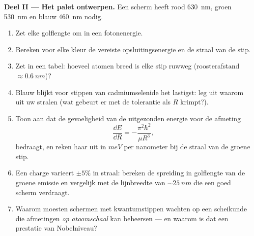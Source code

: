 \begin{problem}
\medskip\noindent\textbf{Deel II --- Het palet ontwerpen.}
Een scherm heeft rood \qty{630}{nm}, groen \qty{530}{nm} en blauw
\qty{460}{nm} nodig.
\begin{enumerate}[resume]
  \item Zet elke golflengte om in een fotonenergie.
  \item Bereken voor elke kleur de vereiste opsluitingsenergie en de
        straal van de stip.
  \item Zet in een tabel: hoeveel atomen breed is elke stip ruwweg
        (roosterafstand $\approx \qty{0.6}{nm}$)?
  \item Blauw blijkt voor stippen van cadmiumselenide het lastigst: leg
        uit waarom uit uw stralen (wat gebeurt er met de tolerantie als
        $R$ krimpt?).
  \item Toon aan dat de gevoeligheid van de uitgezonden energie voor de
        afmeting
        \[
        \frac{\dd E}{\dd R} = -\frac{\pi^2\hbar^2}{\mu R^3} ,
        \]
        bedraagt, en reken haar uit in $\unit{meV}$ per nanometer bij de
        straal van de groene stip.
  \item Een charge varieert $\pm5\%$ in straal: bereken de spreiding in
        golflengte van de groene emissie en vergelijk met de lijnbreedte
        van $\sim\qty{25}{nm}$ die een goed scherm verdraagt.
  \item Waarom moesten schermen met kwantumstippen wachten op een
        scheikunde die afmetingen \emph{op atoomschaal} kan beheersen
        --- en waarom is dat een prestatie van Nobelniveau?
\end{enumerate}


\end{problem}
